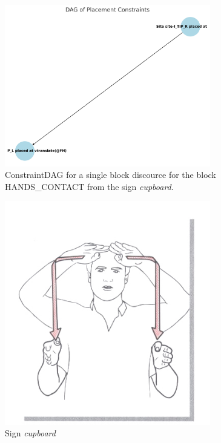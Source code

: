 \documentclass[../../main.tex]{subfiles}
\begin{document}
\begin{figure}[h]
    \centering
    \includegraphics[width=0.8\textwidth]{chapters/multi_track/images/constraint_dag_cupboard.png}
    \caption{ConstraintDAG for a single block discource for the block HANDS\_CONTACT from the sign \emph{cupboard}.}
    \label{fig:constraint_dag_cupboard}
\end{figure}

\begin{figure}
    \centering
    \includegraphics[width=0.8\textwidth]{chapters/multi_track/images/cupboard.jpg}
    \caption{Sign \emph{cupboard}~\cite{moody97}}
    \label{fig:cupboard}
\end{figure}
\end{document}
